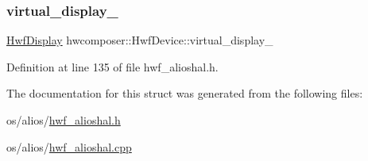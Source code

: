 \subsubsection{\texorpdfstring{virtual\+\_\+display\+\_\+}{virtual\_display\_}}
{\footnotesize\ttfamily \mbox{\hyperlink{structhwcomposer_1_1HwfDisplay}{Hwf\+Display}} hwcomposer\+::\+Hwf\+Device\+::virtual\+\_\+display\+\_\+}



Definition at line 135 of file hwf\+\_\+alioshal.\+h.



The documentation for this struct was generated from the following files\+:\begin{DoxyCompactItemize}
\item 
os/alios/\mbox{\hyperlink{hwf__alioshal_8h}{hwf\+\_\+alioshal.\+h}}\item 
os/alios/\mbox{\hyperlink{hwf__alioshal_8cpp}{hwf\+\_\+alioshal.\+cpp}}\end{DoxyCompactItemize}
